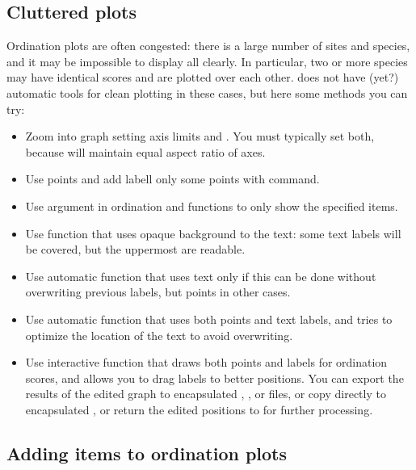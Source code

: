 \documentclass[a4paper,10pt]{article}
\begin{document}
\subsection{Cluttered plots}

Ordination plots are often congested: there is a large number of sites
and species, and it may be impossible to display all clearly.  In
particular, two or more species may have identical scores and are
plotted over each other.   does not have (yet?)
automatic tools for clean plotting in these cases, but here some
methods you can try:
\begin{itemize}
\item Zoom into graph setting axis limits  and
  .  You must typically set both, because 
  will maintain equal aspect ratio of axes.
\item Use points and add labell only some points with 
  command.
\item Use  argument in ordination  and
   functions to only show the specified items.
\item Use  function that uses opaque background to
  the text: some text labels will be covered, but the uppermost are
  readable.
\item Use automatic  function that uses text only if
  this can be done without overwriting previous labels, but points in
  other cases.
\item Use automatic  function that uses both
  points and text labels, and tries to optimize the location of the
  text to avoid overwriting.
\item Use interactive  function that draws both
  points and labels for ordination scores, and allows you to drag
  labels to better positions. You can export the results of the edited
  graph to encapsulated , ,
   or  files, or copy directly to
  encapsulated , or return the edited positions
  to  for further processing.
\end{itemize}

\subsection{Adding items to ordination plots}
\end{document}
